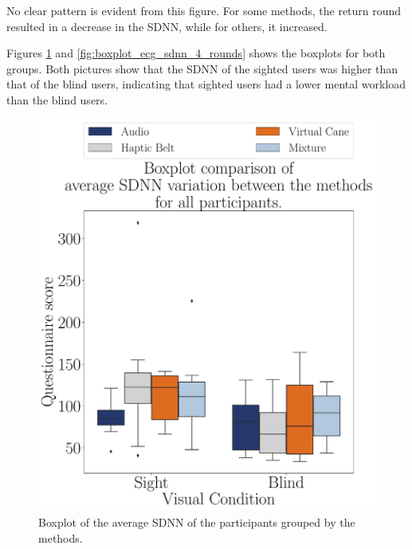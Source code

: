 No clear pattern is evident from this figure. For some methods, the return round resulted in a decrease in the SDNN, while for others, it increased. 

Figures \ref{fig:boxplot_ecg_sdnn_4_scene} and \ref{fig:boxplot_ecg_sdnn_4_rounds} shows the boxplots for both groups. Both pictures show that the SDNN of the sighted users was higher than that of the blind users, indicating that sighted users had a lower mental workload than the blind users.

\begin{figure}[!htb]
    \centering
    \begin{minipage}{0.45\textwidth}
        \centering
        \includegraphics[width = \textwidth]{Resultados/ECG/Figuras/pdf/boxplot_ecg_sdnn_4_scene.pdf}
        \caption{Boxplot of the average SDNN of the participants grouped by the methods.}
        \label{fig:boxplot_ecg_sdnn_4_scene}
    \end{minipage}
    \begin{minipage}{0.075\textwidth}
        \hfill
    \end{minipage}
    \begin{minipage}{0.45\textwidth}

\end{minipage}
\end{figure}
